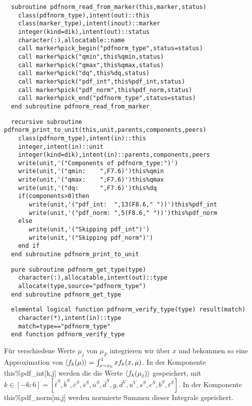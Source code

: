 \begin{Verbatim}
  subroutine pdfnorm_read_from_marker(this,marker,status)
    class(pdfnorm_type),intent(out)::this
    class(marker_type),intent(inout)::marker
    integer(kind=dik),intent(out)::status
    character(:),allocatable::name
    call marker%pick_begin("pdfnorm_type",status=status)
    call marker%pick("qmin",this%qmin,status)
    call marker%pick("qmax",this%qmax,status)
    call marker%pick("dq",this%dq,status)
    call marker%pick("pdf_int",this%pdf_int,status)
    call marker%pick("pdf_norm",this%pdf_norm,status)
    call marker%pick_end("pdfnorm_type",status=status)
  end subroutine pdfnorm_read_from_marker
\end{Verbatim}
\begin{Verbatim}
  recursive subroutine pdfnorm_print_to_unit(this,unit,parents,components,peers)
    class(pdfnorm_type),intent(in)::this
    integer,intent(in)::unit
    integer(kind=dik),intent(in)::parents,components,peers
    write(unit,'("Components of pdfnorm_type:")')
    write(unit,'("qmin:    ",F7.6)')this%qmin
    write(unit,'("qmax:    ",F7.6)')this%qmax
    write(unit,'("dq:      ",F7.6)')this%dq
    if(components>0)then
       write(unit,'("pdf_int:  ",13(F8.6," "))')this%pdf_int
       write(unit,'("pdf_norm: ",5(F8.6," "))')this%pdf_norm
    else
       write(unit,'("Skipping pdf_int")')
       write(unit,'("Skipping pdf_norm")')
    end if
  end subroutine pdfnorm_print_to_unit
\end{Verbatim}
\begin{Verbatim}
  pure subroutine pdfnorm_get_type(type)
    character(:),allocatable,intent(out)::type
    allocate(type,source="pdfnorm_type")
  end subroutine pdfnorm_get_type
\end{Verbatim}
\begin{Verbatim}
  elemental logical function pdfnorm_verify_type(type) result(match)
    character(*),intent(in)::type
    match=type=="pdfnorm_type"
  end function pdfnorm_verify_type
\end{Verbatim}
Für verschiedene Werte $\mu_j$ von $\mu_F$ integrieren wir über $x$ und bekommen so eine Approximation von $\left<f_k(\mu)\right>=\int_{x=x_0}^{1}xf_k(x,\mu)$. In der Komponente this\%pdf\_int[k,j] werden die die Werte $\left<f_k(\mu_j)\right>$ gespeichert, mit $k\in [-6:6]=[\overline{t}^S,\overline{b}^S,\overline{c}^S,\overline{s}^S,\overline{u}^S,\overline{d}^S,g,d^V,u^V,s^S,c^S,b^S,t^S]$. In der Komponente this\%pdf\_norm[m,j] werden normierte Summen dieser Integrale gspeichert.
